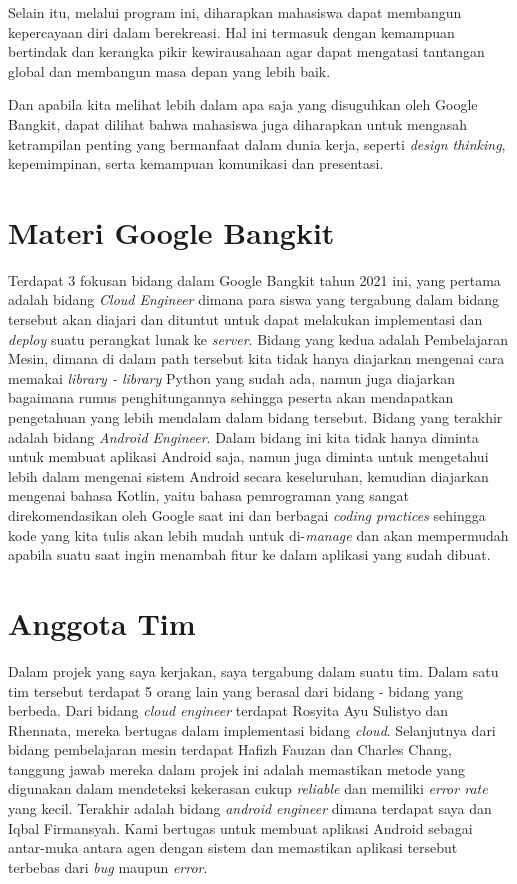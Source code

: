 Selain itu, melalui program ini, diharapkan mahasiswa dapat membangun kepercayaan diri dalam berekreasi. Hal ini termasuk dengan kemampuan bertindak dan kerangka pikir kewirausahaan agar dapat mengatasi tantangan global dan membangun masa depan yang lebih baik.

Dan apabila kita melihat lebih dalam apa saja yang disuguhkan oleh Google Bangkit, dapat dilihat bahwa mahasiswa juga diharapkan untuk mengasah ketrampilan penting yang bermanfaat dalam dunia kerja, seperti \textit{design thinking}, kepemimpinan, serta kemampuan komunikasi dan presentasi.

\section{Materi Google Bangkit}

Terdapat 3 fokusan bidang dalam Google Bangkit tahun 2021 ini, yang pertama adalah bidang \textit{Cloud Engineer} dimana para siswa yang tergabung dalam bidang tersebut akan diajari dan dituntut untuk dapat melakukan implementasi dan \textit{deploy} suatu perangkat lunak ke \textit{server}. Bidang yang kedua adalah Pembelajaran Mesin, dimana di dalam path tersebut kita tidak hanya diajarkan mengenai cara memakai \textit{library - library} Python yang sudah ada, namun juga diajarkan bagaimana rumus penghitungannya sehingga peserta akan mendapatkan pengetahuan yang lebih mendalam dalam bidang tersebut. Bidang yang terakhir adalah bidang \textit{Android Engineer}. Dalam bidang ini kita tidak hanya diminta untuk membuat aplikasi Android saja, namun juga diminta untuk mengetahui lebih dalam mengenai sistem Android secara keseluruhan, kemudian diajarkan mengenai bahasa Kotlin, yaitu bahasa pemrograman yang sangat direkomendasikan oleh Google saat ini dan berbagai \textit{coding practices} sehingga kode yang kita tulis akan lebih mudah untuk di-\textit{manage} dan akan mempermudah apabila suatu saat ingin menambah fitur ke dalam aplikasi yang sudah dibuat.

\section{Anggota Tim}

Dalam projek yang saya kerjakan, saya tergabung dalam suatu tim. Dalam satu tim tersebut terdapat 5 orang lain yang berasal dari bidang - bidang yang berbeda. Dari bidang \textit{cloud engineer} terdapat Rosyita Ayu Sulistyo dan Rhennata, mereka bertugas dalam implementasi bidang \textit{cloud}. Selanjutnya dari bidang pembelajaran mesin terdapat Hafizh Fauzan dan Charles Chang, tanggung jawab mereka dalam projek ini adalah memastikan metode yang digunakan dalam mendeteksi kekerasan cukup \textit{reliable} dan memiliki \textit{error rate} yang kecil. Terakhir adalah bidang \textit{android engineer} dimana terdapat saya dan Iqbal Firmansyah. Kami bertugas untuk membuat aplikasi Android sebagai antar-muka antara agen dengan sistem dan memastikan aplikasi tersebut terbebas dari \textit{bug} maupun \textit{error}.

